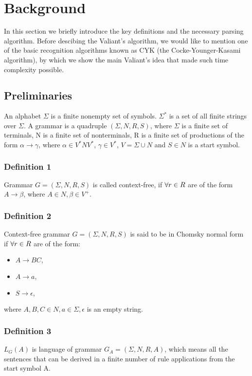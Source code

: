 \section{Background}

In this section we briefly introduce the key definitions and the necessary parsing algorithm. Before descibing the Valiant's  algorithm, we would like to mention one of the basic recognition algorithms known as CYK (the Cocke-Younger-Kasami algorithm), by which we show the main Valiant's idea that made such time complexity possible.

\subsection{Preliminaries}

An alphabet $\Sigma$ is a finite nonempty set of symbols. $\Sigma^{*}$ is a set of all finite strings over $\Sigma$.
A grammar is a quadruple $(\Sigma, N, R, S)$, where $\Sigma$ is a finite set of terminals, N is a finite set of nonterminals, R is a finite set of productions of the form $\alpha \rightarrow \gamma$, where $\alpha \in V^{*}NV^{*}$, $\gamma \in V^{*}$, $V = \Sigma \cup N$ and $S \in N$ is a start symbol.

\subsubsection{Definition 1} Grammar $G = (\Sigma, N, R, S)$ is called context-free, if $\space\forall r \in R$ are of the form $A \rightarrow \beta$, where $A \in N, \beta \in V^{+}$.

\subsubsection{Definition 2} Context-free grammar $G = (\Sigma, N, R, S)$ is said to be in Chomsky normal form if $\space\forall r \in R$ are of the form:
\begin{itemize}
  \item $A \rightarrow BC$,
  \item $A \rightarrow a$,
  \item $S \rightarrow \epsilon$,
\end{itemize}
where $A, B, C \in N, a \in \Sigma, \epsilon$ is an empty string.

\subsubsection{Definition 3} $L_{G}(A)$ is language of grammar $G_{A} = (\Sigma, N, R, A)$, which means all the sentences that can be derived in a finite number of rule applications from the start symbol A.

